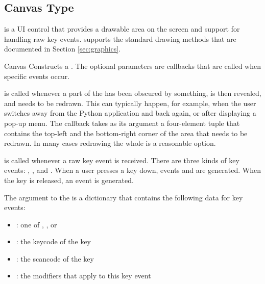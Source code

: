 \subsection{Canvas Type}
\label{subsec:canvas}
 is a UI control that provides a drawable area on the screen 
and support for handling raw key events.  supports the 
standard drawing methods that are documented in Section \ref{sec:graphics}.

\begin{classdesc}{Canvas}{}
Constructs a . The optional parameters are callbacks
that are called when specific events occur. 


 is called whenever a part of the  
has been obscured by something, is then revealed, and needs to be
redrawn. This can typically happen, for example, when the user
switches away from the Python application and back again, or after
displaying a pop-up menu. The callback takes as its argument a
four-element tuple that contains the top-left and the bottom-right
corner of the area that needs to be redrawn. In many cases redrawing
the whole
 is a reasonable option. 

 is called whenever a raw key event is received.
There are three kinds of key events: ,
, and . When a user presses a key 
down, events  and  are generated. 
When the key is released, an  event is generated.

The argument to the  is a dictionary that contains 
the following data for key events:

\begin{itemize}
\item {}: one of , , or 
\item {}: the keycode of the key
\item {}: the scancode of the key
\item {}: the modifiers that apply to this key event
\end{itemize}


\end{classdesc}
